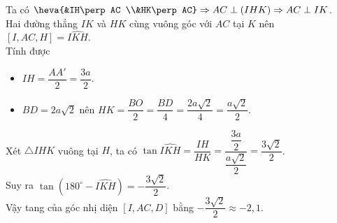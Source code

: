 \begin{ex}
{		Ta có $\heva{&IH\perp AC \\&HK\perp AC}\Rightarrow AC\perp (IHK)\Rightarrow AC\perp IK$.
		\\
		Hai đường thẳng $IK$ và $HK$ cùng vuông góc với $AC$ tại $K$ nên  $[I,AC,H]=\widehat{IKH}$.
		\\
		Tính được
		\begin{itemize}
			\item $IH=\dfrac{AA'}{2}=\dfrac{3a}{2}$.
			\item $BD=2a\sqrt{2}$ nên $HK=\dfrac{BO}{2}=\dfrac{BD}{4}=\dfrac{2a\sqrt{2}}{4}=\dfrac{a\sqrt{2}}{2}$.
		\end{itemize}
		Xét $\triangle IHK$ vuông tại $H$, ta có
		$\tan\widehat{IKH}=\dfrac{IH}{HK}=\dfrac{\dfrac{3a}{2}}{\dfrac{a\sqrt{2}}{2}}=\dfrac{3\sqrt{2}}{2}$.
		\\
		Suy ra $\tan\left(180^\circ-\widehat{IKH}\right)=-\dfrac{3\sqrt{2}}{2}$.
		\\
		Vậy tang của góc nhị diện $[I, AC, D]$ bằng $-\dfrac{3\sqrt{2}}{2}\approx -2{,}1$.
	}
\end{ex}


